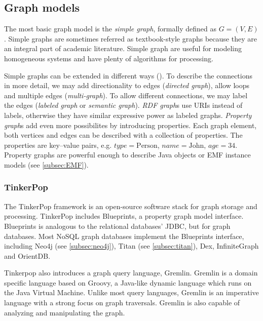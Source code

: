 
\subsection{Graph models}

The most basic graph model is the \emph{simple graph}, formally defined as $G = (V, E)$. Simple graphs are sometimes referred as textbook-style graphs because they are an integral part of academic literature. Simple graph are useful for modeling homogeneous systems and have plenty of algorithms for processing.

Simple graphs can be extended in different ways (). To describe the connections in more detail, we may add directionality to edges (\emph{directed graph}), allow loops and multiple edges (\emph{multi-graph}). To allow different connections, we may label the edges (\emph{labeled graph} or \emph{semantic graph}). \emph{RDF graph}s use URIs instead of labels, otherwise they have similar expressive power as labeled graphs. \emph{Property graph}s add even more possibilites by introducing properties. Each graph element, both vertices and edges can be described with a collection of properties. The properties are key--value pairs, e.g. $\mathit{type} = \mathrm{Person}$, $\mathit{name} = \mathrm{John}$, $\mathit{age} = 34$. Property graphs are powerful enough to describe Java objects or EMF instance models (see \ref{subsec:EMF}).

\subsubsection{TinkerPop}

The TinkerPop framework is an open-source software stack for graph storage and processing. TinkerPop includes Blueprints, a property graph model interface.  Blueprints is analogous to the relational databases' JDBC, but for graph databases. Most NoSQL graph databases implement the Blueprints interface, including Neo4j (see \ref{subsec:neo4j}), Titan (see \ref{subsec:titan}), Dex, InfiniteGraph and OrientDB.  

Tinkerpop also introduces a graph query language, Gremlin. Gremlin is a domain specific language based on Groovy, a Java-like dynamic language which runs on the Java Virtual Machine. Unlike most query languages, Gremlin is an imperative language with a strong focus on graph traversals. Gremlin is also capable of analyzing and manipulating the graph.

